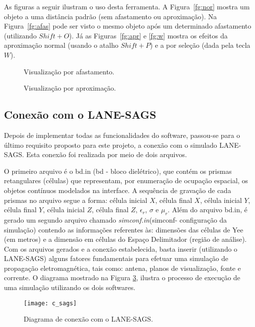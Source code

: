 	As figuras a seguir ilustram o uso desta ferramenta. A Figura~\ref{fg:nor} mostra um objeto a uma distância padrão (sem afastamento ou aproximação). Na Figura~\ref{fg:afas} pode ser visto o mesmo objeto após um determinado afastamento (utilizando $Shift+O$). Já as Figuras~\ref{fg:apr} e \ref{fg:w} mostra os efeitos da  aproximação normal (usando o atalho $Shift+P$) e a por seleção (dada pela tecla $W$).

\begin{figure}[!ht]
	\begin{center}
\qquad
	\end{center}
	\caption{Visualização por afastamento.}
	\label{fg:afastamento}
\end{figure}

\begin{figure}[!ht]
	\begin{center}
		\subfigure[[Visualização de objeto por aproximação normal(sem mudança de foco).]{\label{fg:apr}\texttt{[image: apr]}}
\qquad
	\end{center}
	\caption{Visualização por aproximação.}
	\label{fg:aproximacao}
\end{figure}

\subsection{Conexão com o LANE-SAGS}
\label{sec:c_sags}
	Depois de implementar todas as funcionalidades do software, passou-se para o último requisito proposto para este projeto, a conexão com o simulado LANE-SAGS. Esta conexão foi realizada por meio de dois arquivos.

	O primeiro arquivo é o bd.in (bd - bloco dielétrico), que contém os prismas retangulares (células) que representam, por enumeração de ocupação espacial, os objetos contínuos modelados na interface. A sequência de gravação de cada prismas no arquivo segue a forma: célula inicial $X$, célula final $X$, célula inicial $Y$, célula final $Y$, célula inicial $Z$, célula final $Z$, $\epsilon_r$, $\sigma$ e $\mu_r$.
 Além do arquivo bd.in, é gerado um segundo arquivo chamado \textit{simconf.in}(simconf- configuração da simulação) contendo as informações referentes às: dimensões das células de Yee (em metros) e a dimensão em células do Espaço Delimitador (região de análise).
Com os arquivos gerados e a conexão estabelecida, basta inserir (utilizando o LANE-SAGS) alguns fatores fundamentais para efetuar uma simulação de propagação eletromagnética, tais como: antena, planos de visualização, fonte e corrente. O diagrama mostrado na Figura \ref{fg:c_sags}, ilustra o processo de execução de uma simulação utilizando os dois softwares.

\begin{figure}[!ht]
	\centering
	\texttt{[image: c\_sags]}
	\caption{Diagrama de conexão com o LANE-SAGS.}
	\label{fg:c_sags}
\end{figure}
